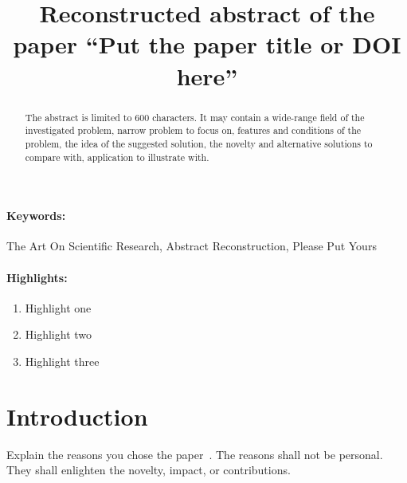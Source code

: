 \documentclass[12pt]{article}
\title{Reconstructed abstract of the paper ``Put the paper title or DOI here''}
\date{}
\begin{document}
\maketitle

\begin{abstract}
The abstract is limited to 600 characters. It may contain a wide-range field of the investigated problem, narrow problem to focus on, features and conditions of the problem, the idea of the suggested solution, the novelty and alternative solutions to compare with, application to illustrate with.
\end{abstract}
\paragraph{Keywords:} The Art On Scientific Research, Abstract Reconstruction, Please Put Yours 

\paragraph{Highlights:}
\begin{enumerate}
\item Highlight one
\item Highlight two
\item Highlight three
\end{enumerate}

\section{Introduction}
Explain the reasons you chose the paper~\cite{9095246}. The reasons shall not be personal. They shall enlighten the novelty, impact, or contributions.  



\end{document}
